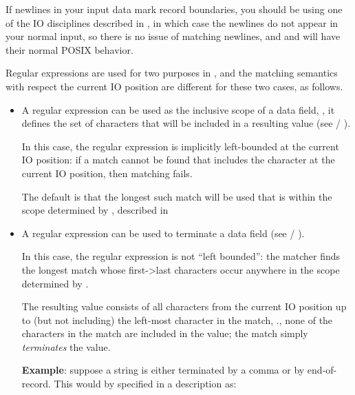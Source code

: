 If newlines in your input data mark record boundaries, you
should be using one of the  IO disciplines described in
, in which case the newlines 
do not appear in your normal input, so there is no issue of 
matching newlines, and  and  will
have their normal POSIX behavior.

Regular expressions are used for two purposes in \pads{},
and the matching semantics with respect the current IO position
are different for these two cases, as follows.

\begin{itemize}

\item A regular expression can be used as the inclusive scope of a data field,
      \ie{}, it defines the set of characters that will be included
      in a resulting value (see  / ).

       In this case, the regular expression is implicitly left-bounded at the
       current IO position: if a match cannot be found that includes
       the character at the current IO position, then matching fails.

       The default is that the longest such match will be used
       that is within the scope determined by
       , described in 
  
\item  A regular expression can be used to terminate a data field
      (see  / ).

      In this case, the regular expression is not ``left bounded'': the
      matcher finds the longest match whose first->last characters
      occur anywhere in the scope determined by .
 
      The resulting value consists of all characters from the current
      IO position up to (but not including) the left-most character
      in the match,  \ie{}., none of the characters in the match are
      included in the value; the match simply \textit{terminates} the value.

      \textbf{Example}: suppose a string is either terminated by a comma
       or by end-of-record.  This would by specified in a \padsl{} description as:

\end{itemize}

